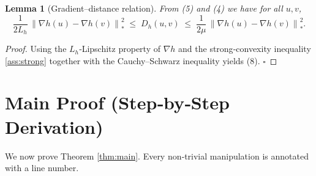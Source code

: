 \documentclass{article}
\newtheorem{lemma}{Lemma}
\newcommand{\dualnorm}[1]{\left\lVert#1\right\rVert_{*}}
\newcommand{\D}[2]{D_{h}(#1,#2)}
\begin{document}
\begin{lemma}[Gradient–distance relation]\label{lem:graddist}
From (5) and (4) we have for all $u,v$,
\[
\frac{1}{2L_h}\,\dualnorm{\nabla h(u)-\nabla h(v)}^{2}
\;\le\;
\D{u}{v}
\;\le\;
\frac{1}{2\mu}\,\dualnorm{\nabla h(u)-\nabla h(v)}^{2}.
\tag{8}
\]
\end{lemma}
\begin{proof}
Using the $L_h$‑Lipschitz property of $\nabla h$ and the
strong‑convexity inequality \eqref{ass:strong} together with the
Cauchy–Schwarz inequality yields (8). \hfill $\square$
\end{proof}

\section*{Main Proof (Step‑by‑Step Derivation)}
We now prove Theorem \ref{thm:main}.  Every non‑trivial manipulation
is annotated with a line number.
\end{document}
